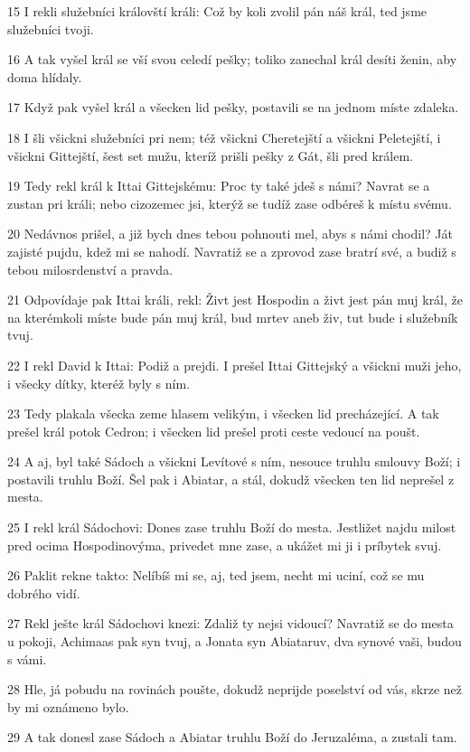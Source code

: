 \par 15 I rekli služebníci královští králi: Což by koli zvolil pán náš král, ted jsme služebníci tvoji.
\par 16 A tak vyšel král se vší svou celedí pešky; toliko zanechal král desíti ženin, aby doma hlídaly.
\par 17 Když pak vyšel král a všecken lid pešky, postavili se na jednom míste zdaleka.
\par 18 I šli všickni služebníci pri nem; též všickni Cheretejští a všickni Peletejští, i všickni Gittejští, šest set mužu, kteríž prišli pešky z Gát, šli pred králem.
\par 19 Tedy rekl král k Ittai Gittejskému: Proc ty také jdeš s námi? Navrat se a zustan pri králi; nebo cizozemec jsi, kterýž se tudíž zase odbéreš k místu svému.
\par 20 Nedávnos prišel, a již bych dnes tebou pohnouti mel, abys s námi chodil? Ját zajisté pujdu, kdež mi se nahodí. Navratiž se a zprovod zase bratrí své, a budiž s tebou milosrdenství a pravda.
\par 21 Odpovídaje pak Ittai králi, rekl: Živt jest Hospodin a živt jest pán muj král, že na kterémkoli míste bude pán muj král, bud mrtev aneb živ, tut bude i služebník tvuj.
\par 22 I rekl David k Ittai: Podiž a prejdi. I prešel Ittai Gittejský a všickni muži jeho, i všecky dítky, kteréž byly s ním.
\par 23 Tedy plakala všecka zeme hlasem velikým, i všecken lid precházející. A tak prešel král potok Cedron; i všecken lid prešel proti ceste vedoucí na poušt.
\par 24 A aj, byl také Sádoch a všickni Levítové s ním, nesouce truhlu smlouvy Boží; i postavili truhlu Boží. Šel pak i Abiatar, a stál, dokudž všecken ten lid neprešel z mesta.
\par 25 I rekl král Sádochovi: Dones zase truhlu Boží do mesta. Jestližet najdu milost pred ocima Hospodinovýma, privedet mne zase, a ukážet mi ji i príbytek svuj.
\par 26 Paklit rekne takto: Nelíbíš mi se, aj, ted jsem, necht mi uciní, což se mu dobrého vidí.
\par 27 Rekl ješte král Sádochovi knezi: Zdaliž ty nejsi vidoucí? Navratiž se do mesta u pokoji, Achimaas pak syn tvuj, a Jonata syn Abiataruv, dva synové vaši, budou s vámi.
\par 28 Hle, já pobudu na rovinách poušte, dokudž neprijde poselství od vás, skrze než by mi oznámeno bylo.
\par 29 A tak donesl zase Sádoch a Abiatar truhlu Boží do Jeruzaléma, a zustali tam.
